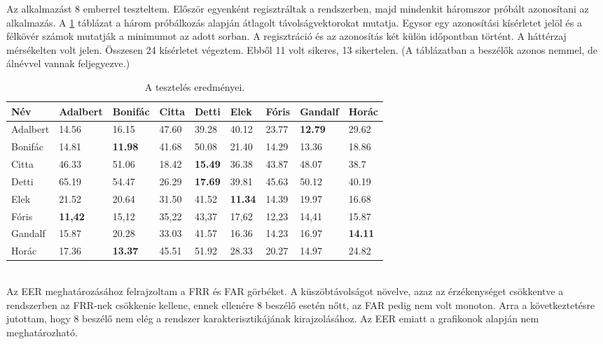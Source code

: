 Az alkalmazást 8 emberrel teszteltem. Először egyenként regisztráltak a rendszerben, majd mindenkit háromszor próbált azonosítani az alkalmazás. A \ref{fig:app-test-results} táblázat a három próbálkozás alapján átlagolt távolságvektorokat mutatja. Egysor egy azonosítási kísérletet jelöl és a félkövér számok mutatják a minimumot az adott sorban.
\newline
\newline
A regisztráció és az azonosítás két külön időpontban történt. A háttérzaj mérsékelten volt jelen. Összesen 24 kísérletet végeztem. Ebből 11 volt sikeres, 13 sikertelen. (A táblázatban a beszélők azonos nemmel, de álnévvel vannak feljegyezve.)

\begin{table}[!ht]
	\begin{tabular}{*9l} \toprule
		\bfseries Név & \bfseries Adalbert & \bfseries Bonifác & \bfseries Citta & \bfseries Detti & \bfseries Elek & \bfseries Fóris & \bfseries Gandalf & \bfseries Horác \\ \midrule
		Adalbert & 14.56 & 16.15 & 47.60 & 39.28 & 40.12 & 23.77 & \textbf{12.79} & 29.62 \\
		Bonifác & 14.81 & \textbf{11.98} & 41.68 & 50.08 & 21.40 & 14.29 & 13.36 & 18.86 \\
		Citta & 46.33 & 51.06 & 18.42 & \textbf{15.49} & 36.38 & 43.87 & 48.07 & 38.7 \\
		Detti & 65.19 & 54.47 & 26.29 & \textbf{17.69} & 39.81 & 45.63 & 50.12 & 40.19 \\
		Elek & 21.52 & 20.64 & 31.50 & 41.52 & \textbf{11.34} & 14.39 & 19.97 & 16.68 \\
		Fóris & \textbf{11,42} & 15,12 & 35,22 & 43,37 & 17,62 & 12,23 & 14,41 & 15.87 \\
		Gandalf & 15.87 & 20.28 & 33.03 & 41.57 & 16.36 & 14.23 & 16.97 & \textbf{14.11} \\
		Horác & 17.36 & \textbf{13.37} & 45.51 & 51.92 & 28.33 & 20.27 & 14.97 & 24.82 \\
		\bottomrule
		\hline
	\end{tabular}
	\centering
	\caption{A tesztelés eredményei.}
	\label{fig:app-test-results}
\end{table}
\ \\
Az EER meghatározásához felrajzoltam a FRR és FAR görbéket. A küszöbtávolságot növelve, azaz az érzékenységet csökkentve a rendszerben az FRR-nek csökkenie kellene, ennek ellenére 8 beszélő esetén nőtt, az FAR pedig nem volt monoton. Arra a következtetésre jutottam, hogy 8 beszélő nem elég a rendszer karakterisztikájának kirajzolásához. Az EER emiatt a grafikonok alapján nem meghatározható.

